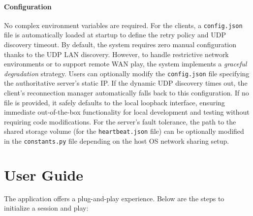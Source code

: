 \documentclass{scrartcl}
\begin{document}
\paragraph{Configuration}
No complex environment variables are required. 
For the clients, a \texttt{config.json} file is automatically loaded at startup to define the retry policy and UDP discovery timeout.
By default, the system requires zero manual configuration thanks to the UDP LAN discovery. 
However, to handle restrictive network environments or to support remote WAN play, the system implements a \textit{graceful degradation} strategy. 
Users can optionally modify the \texttt{config.json} file specifying the authoritative server's static IP. 
If the dynamic UDP discovery times out, the client's reconnection manager automatically falls back to this configuration. 
If no file is provided, it safely defaults to the local loopback interface, ensuring immediate out-of-the-box functionality for local development and testing 
without requiring code modifications.
For the server's fault tolerance, the path to the shared storage volume (for the \texttt{heartbeat.json} file) can be optionally modified in the \texttt{constants.py} file 
depending on the host OS network sharing setup.

\section{User Guide}\label{user-guide}

The application offers a plug-and-play experience. 
Below are the steps to initialize a session and play:
\end{document}
